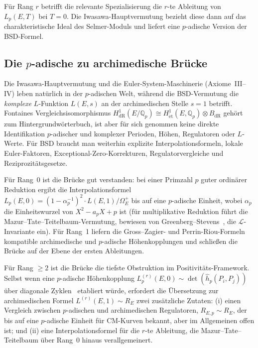 \documentclass[aps,prd,twocolumn,superscriptaddress,nofootinbib,floatfix]{revtex4-2}
\theoremstyle{definition}
\theoremstyle{remark}
\begin{document}
Für Rang $r$ betrifft die relevante Spezialisierung die $r$-te Ableitung von $L_p(E, T)$ bei $T = 0$. Die Iwasawa-Hauptvermutung bezieht diese dann auf das charakteristische Ideal des Selmer-Moduls und liefert eine $p$-adische Version der BSD-Formel.

\subsection{\texorpdfstring{Die $p$-adische zu archimedische Brücke}{Die p-adische zu archimedische Brücke}}
\label{sec:p-adic-bridge}

Die Iwasawa-Hauptvermutung und die Euler-System-Maschinerie (Axiome~III--IV) leben natürlich in der $p$-adischen Welt, während die BSD-Vermutung die \textit{komplexe} $L$-Funktion $L(E,s)$ an der archimedischen Stelle $s = 1$ betrifft. Fontaines Vergleichsisomorphismus $H^1_{\mathrm{dR}}(E/\mathbb{Q}_p) \cong H^1_{\mathrm{\acute{e}t}}(E, \mathbb{Q}_p) \otimes B_{\mathrm{dR}}$ gehört zum Hintergrundwörterbuch, ist aber für sich genommen keine direkte Identifikation $p$-adischer und komplexer Perioden, Höhen, Regulatoren oder $L$-Werte. Für BSD braucht man weiterhin explizite Interpolationsformeln, lokale Euler-Faktoren, Exceptional-Zero-Korrekturen, Regulatorvergleiche und Reziprozitätsgesetze.

Für Rang~0 ist die Brücke gut verstanden: bei einer Primzahl $p$ guter ordinärer Reduktion ergibt die Interpolationsformel $L_p(E,0) = (1 - \alpha_p^{-1})^2 \cdot L(E,1)/\Omega_E^+$ bis auf eine $p$-adische Einheit, wobei $\alpha_p$ die Einheitswurzel von $X^2 - a_p X + p$ ist (für multiplikative Reduktion führt die Mazur--Tate--Teitelbaum-Vermutung, bewiesen von Greenberg--Stevens~\cite{GreenbergStevens1993}, die $\mathcal{L}$-Invariante ein). Für Rang~1 liefern die Gross--Zagier- und Perrin-Riou-Formeln~\cite{PerrinRiou1987} kompatible archimedische und $p$-adische Höhenkopplungen und schließen die Brücke auf der Ebene der ersten Ableitungen.

Für Rang $\geq 2$ ist die Brücke die tiefste Obstruktion im Positivitäts-Framework. Selbst wenn eine $p$-adische Höhenkopplung $L_p^{(r)}(E,0) \sim \det(\hat{h}_p(P_i, P_j))$ über diagonale Zyklen~\cite{DarmonRotger2017} etabliert würde, erfordert die Übersetzung zur archimedischen Formel $L^{(r)}(E,1) \sim R_E$ zwei zusätzliche Zutaten: (i) einen Vergleich zwischen $p$-adischen und archimedischen Regulatoren, $R_{E,p} \sim R_E$, der bis auf eine $p$-adische Einheit für CM-Kurven bekannt, aber im Allgemeinen offen ist; und (ii) eine Interpolationsformel für die $r$-te Ableitung, die Mazur--Tate--Teitelbaum über Rang~0 hinaus verallgemeinert.
\end{document}
